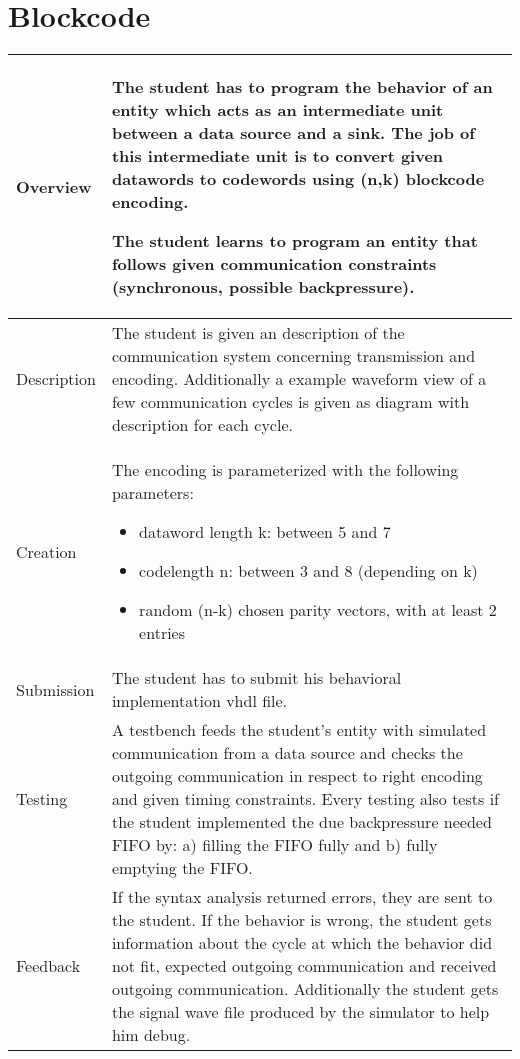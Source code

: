 \section{Blockcode}
    \begin{tabular}{|p{2cm}|p{13cm}|}
        \hline
        Overview & The student has to program the behavior of an entity which acts as an intermediate unit between a
			data source and a sink. The job of this intermediate unit is to convert given datawords to codewords using
			(n,k) blockcode encoding.

			The student learns to program an entity that follows given communication constraints (synchronous,
			possible backpressure).
        \\
        \hline
        Description & The student is given an description of the communication system concerning transmission and
			encoding. Additionally a example waveform view of a few communication cycles is given as diagram with
			description for each cycle.
        \\
        \hline
        Creation & The encoding is parameterized with the following parameters:
			\begin{itemize}
				\item dataword length k: between 5 and 7
				\item codelength n: between 3 and 8 (depending on k)
				\item random (n-k) chosen parity vectors, with at least 2 entries
			\end{itemize}
		\\
        \hline
        Submission & The student has to submit his behavioral implementation vhdl file.
        \\
        \hline
        Testing & A testbench feeds the student's entity with simulated communication from a data source and checks
			the outgoing communication in respect to right encoding and given timing constraints. Every testing also
			tests if the student implemented the due backpressure needed FIFO by: a) filling the FIFO fully and b) fully
			emptying the FIFO.
        \\
        \hline
        Feedback & If the syntax analysis returned errors, they are sent to the student. If the behavior is wrong, the
			student gets information about the cycle at which the behavior did not fit, expected outgoing communication
			and received outgoing communication. Additionally the student gets the signal wave file produced by the
			simulator to help him debug.
        \\
        \hline
    \end{tabular}

